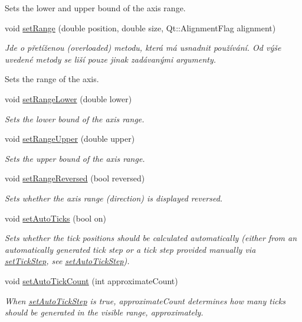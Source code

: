\begin{DoxyCompactItemize}
\begin{DoxyCompactList}
Sets the lower and upper bound of the axis range. \end{DoxyCompactList}\item 
void \hyperlink{classQCPAxis_acf60e5b2d631fbc8c4548c3d579cb6d0}{set\+Range} (double position, double size, Qt\+::\+Alignment\+Flag alignment)
\begin{DoxyCompactList}\small\item\em Jde o přetíženou (overloaded) metodu, která má usnadnit používání. Od výše uvedené metody se liší pouze jinak zadávanými argumenty.

Sets the range of the axis. \end{DoxyCompactList}\item 
void \hyperlink{classQCPAxis_afcf51227d337db28d1a9ce9a4d1bc91a}{set\+Range\+Lower} (double lower)
\begin{DoxyCompactList}\small\item\em Sets the lower bound of the axis range. \end{DoxyCompactList}\item 
void \hyperlink{classQCPAxis_acd3ca1247aa867b540cd5ec30ccd3bef}{set\+Range\+Upper} (double upper)
\begin{DoxyCompactList}\small\item\em Sets the upper bound of the axis range. \end{DoxyCompactList}\item 
void \hyperlink{classQCPAxis_a2172fdb196b1a0dc3f40992fcad8e9e1}{set\+Range\+Reversed} (bool reversed)
\begin{DoxyCompactList}\small\item\em Sets whether the axis range (direction) is displayed reversed. \end{DoxyCompactList}\item 
void \hyperlink{classQCPAxis_ae867c23d3a6a7bd4d09cc66c5d018f63}{set\+Auto\+Ticks} (bool on)
\begin{DoxyCompactList}\small\item\em Sets whether the tick positions should be calculated automatically (either from an automatically generated tick step or a tick step provided manually via \hyperlink{classQCPAxis_af727db0acc6492c4c774c0700e738205}{set\+Tick\+Step}, see \hyperlink{classQCPAxis_a99fe77b034e06f5b723995beab96e741}{set\+Auto\+Tick\+Step}). \end{DoxyCompactList}\item 
void \hyperlink{classQCPAxis_a7c7111cbeac9ec5fcb40f93a1ef51a0b}{set\+Auto\+Tick\+Count} (int approximate\+Count)
\begin{DoxyCompactList}\small\item\em When \hyperlink{classQCPAxis_a99fe77b034e06f5b723995beab96e741}{set\+Auto\+Tick\+Step} is true, {\itshape approximate\+Count} determines how many ticks should be generated in the visible range, approximately. \end{DoxyCompactList}\item 

\end{DoxyCompactItemize}
